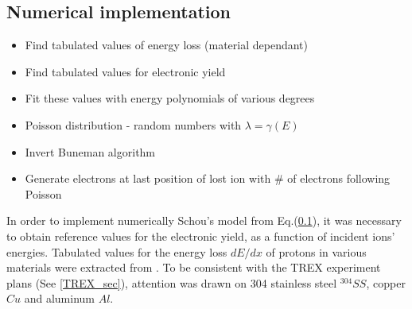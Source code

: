 \subsection{Numerical implementation}
\begin{itemize}
\item{Find tabulated values of energy loss (material dependant)}
\item{Find tabulated values for electronic yield}
\item{Fit these values with energy polynomials of various degrees}
\item{Poisson distribution - random numbers with $\lambda=\gamma(E)$}
\item{Invert Buneman algorithm}
\item{Generate electrons at last position of lost ion with \# of electrons following Poisson}
\end{itemize}



In order to implement numerically Schou's model from Eq.(\ref{}), it was necessary to obtain reference values for the electronic yield, as a function of incident ions' energies. Tabulated values for the energy loss $dE/dx$ of protons in various materials were extracted from \cite{Janni_vol1, Janni_vol2}. To be consistent with the TREX experiment plans (See \ref{TREX_sec}), attention was drawn on 304 stainless steel $^{304}SS$, copper $Cu$ and aluminum $Al$. 
